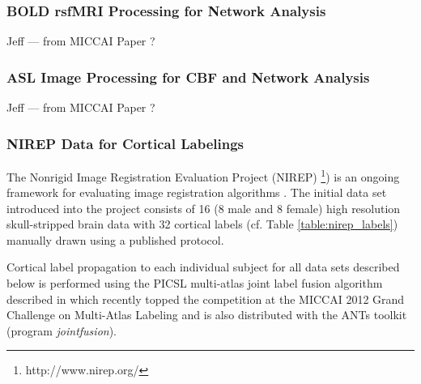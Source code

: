 \subsubsection{BOLD rsfMRI Processing for Network Analysis}

Jeff --- from MICCAI Paper ?

\subsubsection{ASL Image Processing for CBF and Network Analysis}

Jeff --- from MICCAI Paper ?

\subsubsection{NIREP Data for Cortical Labelings}

The Nonrigid Image Registration Evaluation Project (NIREP)
\footnote{
http://www.nirep.org/
}) 
is an ongoing framework for evaluating image registration algorithms \citep{christensen2006}.
The initial data set introduced into the project consists of 
16 (8 male and 8 female) high resolution skull-stripped brain 
data with 32 cortical labels (cf. Table \ref{table:nirep_labels}) manually drawn using a 
published protocol.

Cortical label propagation to each individual subject for all data sets
described below is performed using the PICSL multi-atlas joint label fusion
algorithm described in \cite{wang2013} which recently topped the competition
at the MICCAI 2012 Grand Challenge on Multi-Atlas Labeling and is also 
distributed with the ANTs toolkit (program {\em jointfusion}).


